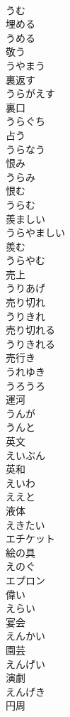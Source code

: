 \documentclass[8pt]{extreport}
\begin{document}
\begin{CJK}{UTF8}{min}
\\	うむ	
\\	埋める 
\\	うめる	
\\	敬う 
\\	うやまう	
\\	裏返す 
\\	うらがえす	
\\	裏口 
\\	うらぐち	
\\	占う 
\\	うらなう	
\\	恨み 
\\	うらみ	
\\	恨む 
\\	うらむ	
\\	羨ましい 
\\	うらやましい	
\\	羨む 
\\	うらやむ	
\\	売上 
\\	うりあげ	
\\	売り切れ 
\\	うりきれ	
\\	売り切れる 
\\	うりきれる	
\\	売行き 
\\	うれゆき	
\\	うろうろ	
\\	運河 
\\	うんが	
\\	うんと	
\\	英文 
\\	えいぶん	
\\	英和 
\\	えいわ	
\\	ええと	
\\	液体 
\\	えきたい	
\\	エチケット	
\\	絵の具 
\\	えのぐ	
\\	エプロン	
\\	偉い 
\\	えらい	
\\	宴会 
\\	えんかい	
\\	園芸 
\\	えんげい	
\\	演劇 
\\	えんげき	
\\	円周 

\end{CJK}
\end{document}
